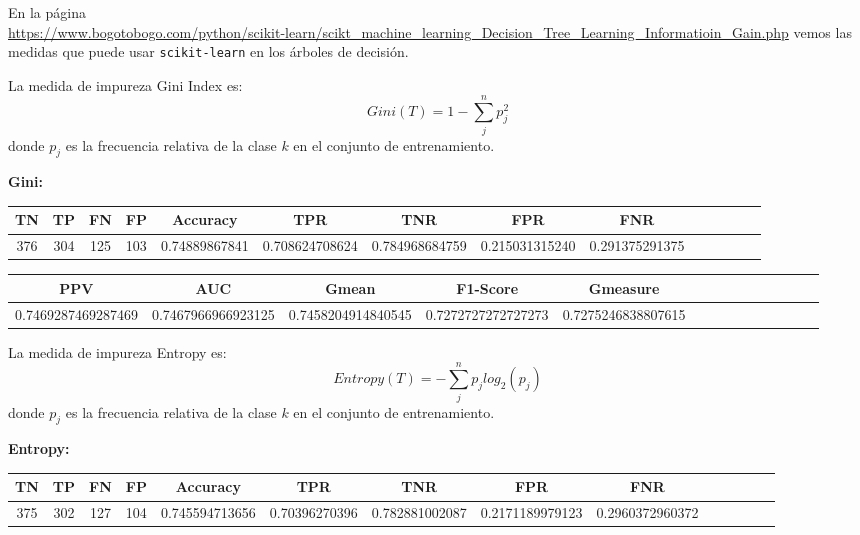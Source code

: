 \documentclass[a4]{article}
\begin{document}
En la página\\
\href{https://www.bogotobogo.com/python/scikit-learn/scikt_machine\_learning\_Decision\_Tree\_Learning\_Informatioin\_Gain\_IG\_Impurity\_Entropy\_Gini\_Classification\_Error.php}{https://www.bogotobogo.com/python/scikit-learn/scikt\_machine\_learning\_Decision\_Tree\_Learning\_Informatioin\_Gain.php} vemos las medidas que puede usar \texttt{scikit-learn} en los árboles de decisión.

La medida de impureza Gini Index es: 
\[Gini (T) = 1-\sum\limits_{j}^{n}p_j^2\] donde $p_j$ es la frecuencia relativa de la clase $k$ en el conjunto de entrenamiento. 

\textbf{Gini:}
\begin{center}
\begin{tabular}{|c|c|c|c|c|c|c|c|c|c|c|c|c|c|}
\hline
\multicolumn{1}{|c|}{\textbf{TN}}& \textbf{TP} & \textbf{FN} & \textbf{FP} & \textbf{Accuracy} & \textbf{TPR} & \textbf{TNR} & \textbf{FPR} &\textbf{FNR} \\ \hline
  376 & 304 & 125 & 103 & 0.74889867841 & 0.708624708624 & 0.784968684759 & 0.215031315240 & 0.291375291375 \\ \hline
\end{tabular}
\end{center}

\begin{center}
\begin{tabular}{|c|c|c|c|c|c|c|c|c|c|c|c|c|c|}
\hline
\multicolumn{1}{|c|}{\textbf{PPV}} & \textbf{AUC} & \textbf{Gmean} & \textbf{F1-Score} & \textbf{Gmeasure}  \\ \hline
  0.7469287469287469 & 0.7467966966923125 & 0.7458204914840545 & 0.7272727272727273 & 0.7275246838807615 \\ \hline
\end{tabular}
\end{center}

\vspace{5mm}

La medida de impureza Entropy es:
\[Entropy (T) = -\sum\limits_{j}^{n}p_jlog_2(p_j)\] donde $p_j$ es la frecuencia relativa de la clase $k$ en el conjunto de entrenamiento. 

\textbf{Entropy:}
\begin{center}
\begin{tabular}{|c|c|c|c|c|c|c|c|c|c|c|c|c|c|}
\hline
\multicolumn{1}{|c|}{\textbf{TN}}& \textbf{TP} & \textbf{FN} & \textbf{FP} & \textbf{Accuracy} & \textbf{TPR} & \textbf{TNR} & \textbf{FPR} &\textbf{FNR} \\ \hline
  375 & 302 & 127 & 104 & 0.745594713656 & 0.70396270396 & 0.782881002087 & 0.2171189979123 & 0.2960372960372 \\ \hline
\end{tabular}
\end{center}
\end{document}

